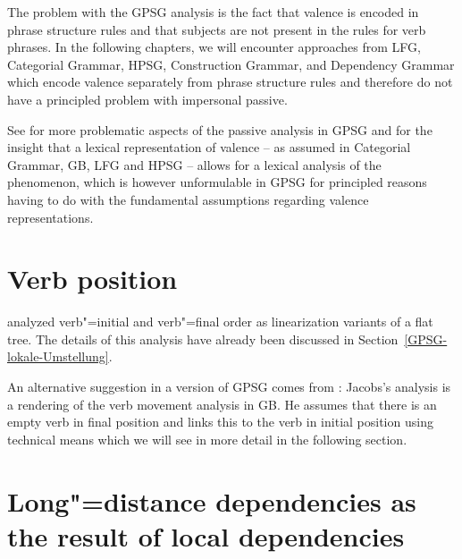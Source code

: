 The problem with the GPSG analysis is the fact that valence is encoded in phrase structure rules and that subjects are not present in the rules
for verb phrases. In the following chapters, we will encounter approaches from LFG\indexlfg,
Categorial Grammar\indexcg, HPSG\indexhpsg, Construction Grammar\indexcxg, and Dependency Grammar\indexdg
which encode valence separately from phrase structure rules and therefore do not have a principled problem with impersonal passive.

See \citet[--396]{Jacobson87b} for more problematic aspects of the passive analysis in GPSG and for the insight that a lexical representation of valence -- as assumed
in Categorial Grammar, GB, LFG and HPSG -- allows for a lexical analysis of the phenomenon, which is however unformulable in GPSG for principled reasons having to
do with the fundamental assumptions regarding valence representations.

\section{Verb position}
\label{Abschnitt-Verbstellung-GPSG}

\mbox{}\citet{Uszkoreit87a} analyzed verb"=initial and verb"=final order as linearization variants of a flat tree. The details of this analysis have already
been discussed in Section~\ref{GPSG-lokale-Umstellung}.

An alternative suggestion in a version of GPSG comes from \citet[]{Jacobs86a}: Jacobs's analysis is a rendering of the verb movement analysis in GB. He assumes that there
is an empty verb in final position and links this to the verb in initial position using technical
means which we will see in more detail in the following section.

\section{Long"=distance dependencies as the result of local dependencies}
\label{Abschnitt-GPSG-Fernabhaengigkeiten}\label{sec-nld-gpsg}

